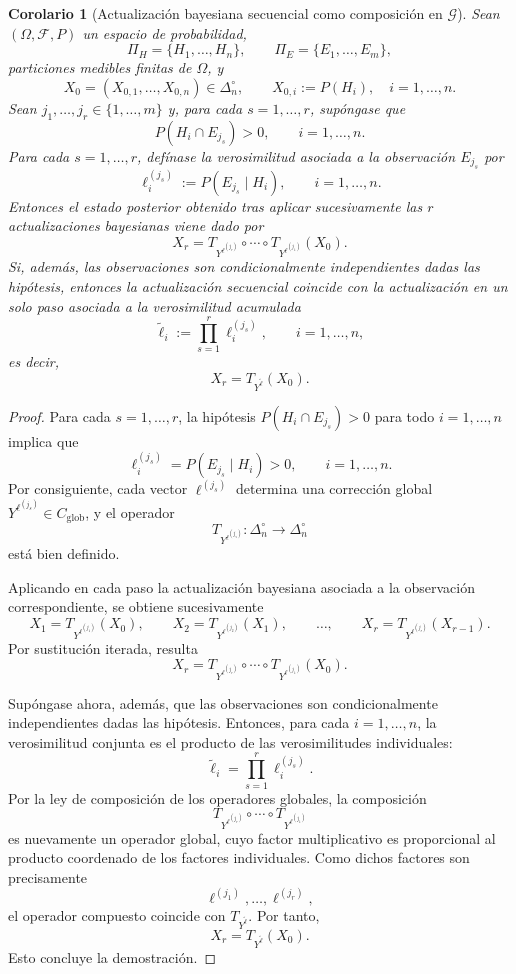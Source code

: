 \documentclass[12pt]{article}
\newtheorem{corolario}{Corolario}[section]
\begin{document}

\begin{corolario}[Actualización bayesiana secuencial como composición en $\mathcal G$]\label{cor:bayes_secuencial}
Sean $(\Omega,\mathcal F,P)$ un espacio de probabilidad,
\[
\Pi_H=\{H_1,\dots,H_n\},
\qquad
\Pi_E=\{E_1,\dots,E_m\},
\]
particiones medibles finitas de $\Omega$, y
\[
X_0=(X_{0,1},\dots,X_{0,n})\in\Delta_n^\circ,
\qquad
X_{0,i}:=P(H_i),\quad i=1,\dots,n.
\]
Sean $j_1,\dots,j_r\in\{1,\dots,m\}$ y, para cada $s=1,\dots,r$, supóngase que
\[
P(H_i\cap E_{j_s})>0,\qquad i=1,\dots,n.
\]
Para cada $s=1,\dots,r$, defínase la verosimilitud asociada a la observación $E_{j_s}$ por
\[
\ell_i^{(j_s)}:=P(E_{j_s}\mid H_i),\qquad i=1,\dots,n.
\]
Entonces el estado posterior obtenido tras aplicar sucesivamente las $r$ actualizaciones bayesianas viene dado por
\[
X_r=
T_{Y^{\ell^{(j_r)}}}\circ\cdots\circ T_{Y^{\ell^{(j_1)}}}(X_0).
\]
Si, además, las observaciones son condicionalmente independientes dadas las hipótesis, entonces la actualización secuencial coincide con la actualización en un solo paso asociada a la verosimilitud acumulada
\[
\widetilde{\ell}_i:=\prod_{s=1}^r \ell_i^{(j_s)},
\qquad i=1,\dots,n,
\]
es decir,
\[
X_r=T_{Y^{\widetilde{\ell}}}(X_0).
\]
\end{corolario}

\begin{proof}
Para cada $s=1,\dots,r$, la hipótesis $P(H_i\cap E_{j_s})>0$ para todo $i=1,\dots,n$ implica que
\[
\ell_i^{(j_s)}=P(E_{j_s}\mid H_i)>0,\qquad i=1,\dots,n.
\]
Por consiguiente, cada vector $\ell^{(j_s)}$ determina una corrección global $Y^{\ell^{(j_s)}}\in C_{\mathrm{glob}}$, y el operador
\[
T_{Y^{\ell^{(j_s)}}}:\Delta_n^\circ\to\Delta_n^\circ
\]
está bien definido.

Aplicando en cada paso la actualización bayesiana asociada a la observación correspondiente, se obtiene sucesivamente
\[
X_1=T_{Y^{\ell^{(j_1)}}}(X_0),\qquad
X_2=T_{Y^{\ell^{(j_2)}}}(X_1),\qquad \dots,\qquad
X_r=T_{Y^{\ell^{(j_r)}}}(X_{r-1}).
\]
Por sustitución iterada, resulta
\[
X_r=
T_{Y^{\ell^{(j_r)}}}\circ\cdots\circ T_{Y^{\ell^{(j_1)}}}(X_0).
\]

Supóngase ahora, además, que las observaciones son condicionalmente independientes dadas las hipótesis. Entonces, para cada $i=1,\dots,n$, la verosimilitud conjunta es el producto de las verosimilitudes individuales:
\[
\widetilde{\ell}_i=\prod_{s=1}^r \ell_i^{(j_s)}.
\]
Por la ley de composición de los operadores globales, la composición
\[
T_{Y^{\ell^{(j_r)}}}\circ\cdots\circ T_{Y^{\ell^{(j_1)}}}
\]
es nuevamente un operador global, cuyo factor multiplicativo es proporcional al producto coordenado de los factores individuales. Como dichos factores son precisamente
\[
\ell^{(j_1)},\dots,\ell^{(j_r)},
\]
el operador compuesto coincide con $T_{Y^{\widetilde{\ell}}}$. Por tanto,
\[
X_r=T_{Y^{\widetilde{\ell}}}(X_0).
\]
Esto concluye la demostración.
\end{proof}
\end{document}
